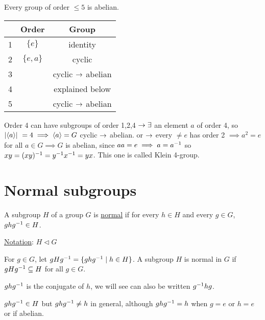 \documentclass[]{article}
\begin{document}
\begin{proposition}
	Every group of order $\leq 5$ is abelian.
	\begin{center}
	\begin{tabular}{c|cc}
			 & Order & Group  \\
		\hline
	1 & $\{e\}$ &  identity \\
	2 & $\{e,a\}$  & cyclic \\
	3 & & cyclic $\rightarrow$ abelian \\
	4 & & explained below \\
	5 & & cyclic $\rightarrow$ abelian
	\end{tabular}
	\end{center}
	Order 4 can have subgroups of order 1,2,4 $\rightarrow \exists$ an element $a$ of order 4, so $|\langle a \rangle|\ = 4 \implies \langle a \rangle = G$ cyclic $\rightarrow$ abelian. or $\rightarrow$ every $\neq e$ has order 2 $\implies a^2 = e$ for all $a\in G \implies G$ is abelian, since $aa = e \implies a = a^{-1}$ so $xy = (xy)^{-1} = y^{-1} x^{-1} = yx$. This one is called Klein 4-group.
\end{proposition}

\section{Normal subgroups}

\begin{definition}
	A subgroup $H$ of a group $G$ is \ul{normal} if for every $h\in H$ and every $g\in G$, $ghg^{-1}\in H$.
\end{definition}
\ul{Notation}: $H\triangleleft G$

For $g\in G$, let $gHg^{-1} = \{ghg^{-1} \mid h\in H\}$.
A subgroup $H$ is normal in $G$ if $gHg^{-1}\subseteq H$ for all $g\in G$.

\begin{remark}
	$ghg^{-1}$ is the conjugate of $h$, we will see can also be written $g^{-1} hg$.
\end{remark}
\begin{note}
	$ghg^{-1}\in H$ but $ghg^{-1} \neq h$ in general, although $ghg^{-1} = h$ when $g = e$ or $h = e$ or if abelian.
\end{note}

\newpage
\end{document}
